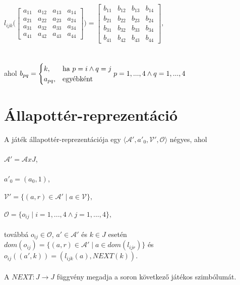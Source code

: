 \documentclass[fleqn]{article}
\begin{document}
$l_{ijk}\Bigg(\begin{bmatrix}
	a_{11} & a_{12} & a_{13} & a_{14} \\
	a_{21} & a_{22} & a_{23} & a_{24} \\
	a_{31} & a_{32} & a_{33} & a_{34} \\
	a_{41} & a_{42} & a_{43} & a_{44}
\end{bmatrix}\Bigg) = \begin{bmatrix}
	b_{11} & b_{12} & b_{13} & b_{14} \\
	b_{21} & b_{22} & b_{23} & b_{24} \\
	b_{31} & b_{32} & b_{33} & b_{34} \\
	b_{41} & b_{42} & b_{43} & b_{44}
\end{bmatrix},$\\\\\\
ahol
$
    b_{pq}=
\begin{cases}
    k,& \text{ha } p = i \wedge q = j \\
    a_{pq},              & \text{egyébként}
\end{cases}
\hfill  p = 1, ..., 4 \wedge q = 1, ..., 4\\
$


\section{Állapottér-reprezentáció}

A játék állapottér-reprezentációja egy $\langle\mathcal{A'},  a'_0, \mathcal{V'}, \mathcal{O}\rangle$ négyes, ahol\\\\
$\mathcal{A'} = \mathcal{A} x J$,\\\\
$a'_{0} = (a_{0}, 1)$,\\\\
$\mathcal{V'} = \{ (a, r) \in \mathcal{A'} \mid a \in \mathcal{V} \},$\\\\
$\mathcal{O} = \{ o_{ij} \mid i = 1, ..., 4 \wedge j = 1, ..., 4 \},$\\\\
továbbá $o_{ij} \in \mathcal{O}$, $a' \in \mathcal{A'}$ és $k \in J$ esetén $dom(o_{ij}) = \{ (a, r) \in \mathcal{A'} \mid a \in dom(l_{ijr})\}$ és\\ $o_{ij}((a', k)) = (l_{ijk}(a), NEXT(k))$.
\\\\
A $NEXT: J \rightarrow J$ függvény megadja a soron következő játékos szimbólumát.
\end{document}
